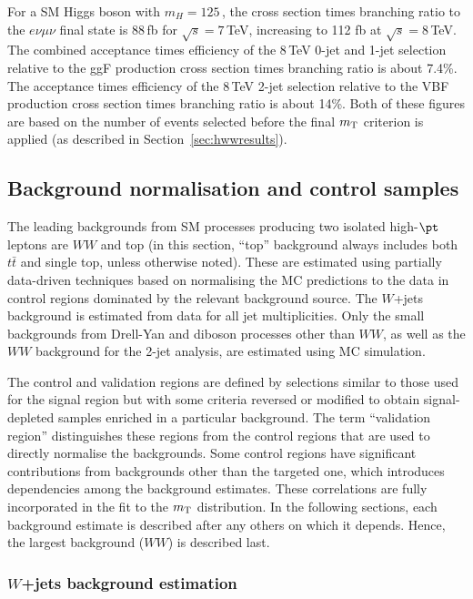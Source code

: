 \documentclass[final,3p,times,twocolumn]{elsarticle}
\newcommand{\ZeroJet}{\mbox{0-jet}}
\newcommand{\OneJet}{\mbox{1-jet}}
\newcommand{\TwoJet}{\mbox{2-jet}}
\newcommand{\Wjets}{$W$+jets}
\begin{document}
 For a SM Higgs boson with $m_H = 125$\,\GeV, the cross section times branching ratio to 
the $e\nu\mu\nu$ final state is 88\,fb for $\sqrt{s}=7$\,TeV, increasing to 112 fb at $\sqrt{s}=8$\,TeV. 
The combined acceptance times efficiency of the 8\,TeV \ZeroJet{} and \OneJet{} selection relative to the  
ggF production cross section times branching ratio is about 7.4\%.  The acceptance times efficiency of the 
8\,TeV \TwoJet{} selection relative to the VBF production cross section times branching ratio is about 14\%.  
Both of these figures are based on the number of events selected before the final $m_{\rm T}$ criterion is applied
(as described in Section~\ref{sec:hwwresults}).


\subsection{Background normalisation and control samples}
\label{sec:control}

The leading backgrounds from SM			
processes producing two isolated high-$\pt$ leptons are $WW$ and top (in this section, 
``top'' background always includes both $t\bar{t}$ and single top, unless otherwise noted).
These are estimated using partially data-driven techniques based on normalising the MC
predictions to the data in control regions dominated by the relevant background source.
The \Wjets{} background
is estimated from data for all jet multiplicities.
Only the small backgrounds from Drell-Yan and diboson processes other than $WW$, 	
as well as the $WW$ background for the \TwoJet{} analysis, are estimated using MC simulation.  

The control and validation regions are defined by selections similar to those used for the signal region
but with some criteria reversed or modified to obtain signal-depleted samples enriched
in a particular background.  
The term ``validation region'' distinguishes these regions from the control
regions that are used to directly normalise the backgrounds.
Some control regions have significant contributions from backgrounds other than the targeted
one, which introduces dependencies among the background estimates.  These correlations
are fully incorporated in the fit to the $m_{\rm T}$ distribution.  In the following sections, 
each background estimate is described after any others on which it depends.
Hence, the largest background ($WW$) is described last.

\subsubsection{\Wjets{} background estimation} 
\label{sec:wjets-control}
\end{document}

